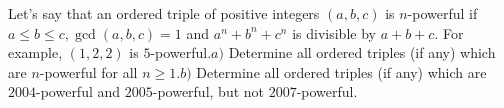 Let's say that an ordered triple of positive integers $(a,b,c)$ is $n$-powerful if $a\le b\le c,\gcd (a,b,c)=1$ and $a^n+b^n+c^n$ is divisible by $a+b+c$. For example, $(1,2,2)$ is $5$-powerful.$a)$ Determine all ordered triples (if any) which are $n$-powerful for all $n\ge 1$.$b)$ Determine all ordered triples (if any) which are $2004$-powerful and $2005$-powerful, but not $2007$-powerful.